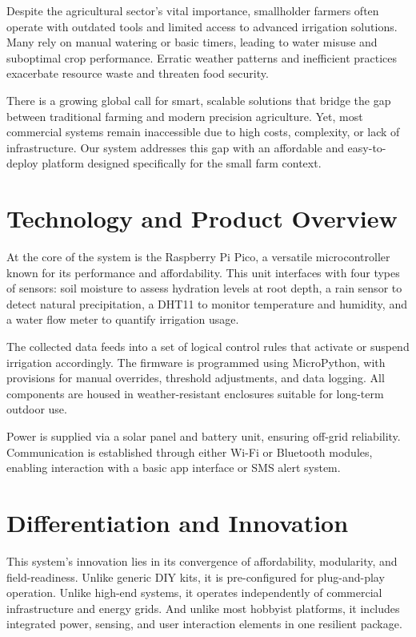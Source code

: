 \documentclass{IEEEtran}
\begin{document}
Despite the agricultural sector's vital importance, smallholder farmers often operate with outdated tools and limited access to advanced irrigation solutions. Many rely on manual watering or basic timers, leading to water misuse and suboptimal crop performance. Erratic weather patterns and inefficient practices exacerbate resource waste and threaten food security.

There is a growing global call for smart, scalable solutions that bridge the gap between traditional farming and modern precision agriculture. Yet, most commercial systems remain inaccessible due to high costs, complexity, or lack of infrastructure. Our system addresses this gap with an affordable and easy-to-deploy platform designed specifically for the small farm context.

\section{Technology and Product Overview}

At the core of the system is the Raspberry Pi Pico, a versatile microcontroller known for its performance and affordability. This unit interfaces with four types of sensors: soil moisture to assess hydration levels at root depth, a rain sensor to detect natural precipitation, a DHT11 to monitor temperature and humidity, and a water flow meter to quantify irrigation usage.

The collected data feeds into a set of logical control rules that activate or suspend irrigation accordingly. The firmware is programmed using MicroPython, with provisions for manual overrides, threshold adjustments, and data logging. All components are housed in weather-resistant enclosures suitable for long-term outdoor use.

Power is supplied via a solar panel and battery unit, ensuring off-grid reliability. Communication is established through either Wi-Fi or Bluetooth modules, enabling interaction with a basic app interface or SMS alert system.

\section{Differentiation and Innovation}

This system's innovation lies in its convergence of affordability, modularity, and field-readiness. Unlike generic DIY kits, it is pre-configured for plug-and-play operation. Unlike high-end systems, it operates independently of commercial infrastructure and energy grids. And unlike most hobbyist platforms, it includes integrated power, sensing, and user interaction elements in one resilient package.
\end{document}
